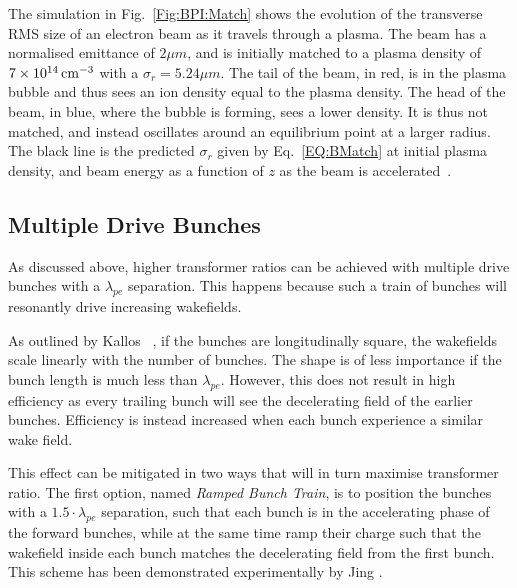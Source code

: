 The simulation in Fig.~\ref{Fig:BPI:Match} shows the evolution of the transverse RMS size of an electron beam as it travels through a plasma. The beam has a normalised emittance of $2\unit{\mu m}$, and is initially matched to a plasma density of $7\times 10^{14}\,\mathrm{cm}^{-3}$ with a $\sigma_{r} = 5.24\unit{\mu m}$. The tail of the beam, in red, is in the plasma bubble and thus sees an ion density equal to the plasma density. The head of the beam, in blue, where the bubble is forming, sees a lower density. It is thus not matched, and instead oscillates around an equilibrium point at a larger radius. The black line is the predicted $\sigma_{r}$ given by Eq.~\ref{EQ:BMatch} at initial plasma density, and beam energy as a function of $z$ as the beam is accelerated~\cite{berglyd_olsen:2018}.

\subsection{Multiple Drive Bunches}
\label{Int:BPI:Multi}

As discussed above, higher transformer ratios can be achieved with multiple drive bunches with a $\lambda_{pe}$ separation. This happens because such a train of bunches will resonantly drive increasing wakefields.

As outlined by Kallos \etal~\cite{kallos:2007}, if the bunches are longitudinally square, the wakefields scale linearly with the number of bunches. The shape is of less importance if the bunch length is much less than $\lambda_{pe}$. However, this does not result in high efficiency as every trailing bunch will see the decelerating field of the earlier bunches. Efficiency is instead increased when each bunch experience a similar wake field.

This effect can be mitigated in two ways that will in turn maximise transformer ratio. The first option, named \textit{Ramped Bunch Train}, is to position the bunches with a $1.5\cdot\lambda_{pe}$ separation, such that each bunch is in the accelerating phase of the forward bunches, while at the same time ramp their charge such that the wakefield inside each bunch matches the decelerating field from the first bunch. This scheme has been demonstrated experimentally by Jing \etal \cite{jing:2006,jing:2007}.


